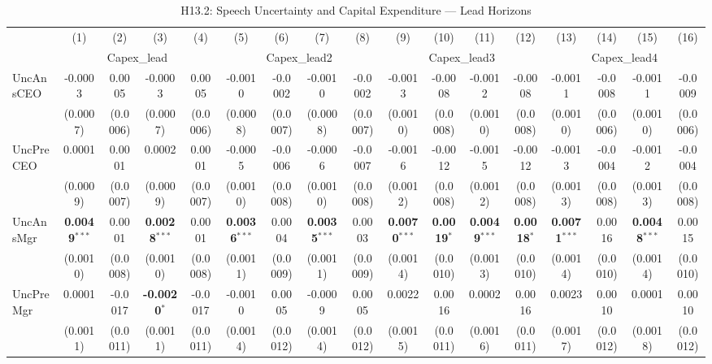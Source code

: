 \begin{landscape}
\begin{table}[H]
\setlength{\tabcolsep}{3pt}
\renewcommand{\arraystretch}{0.85}
\centering
\caption{H13.2: Speech Uncertainty and Capital Expenditure --- Lead Horizons}
\label{tab:h13_2}
\scriptsize
\begin{tabular}{lcccccccccccccccc}
\toprule
 & (1) & (2) & (3) & (4) & (5) & (6) & (7) & (8) & (9) & (10) & (11) & (12) & (13) & (14) & (15) & (16) \\
 & \multicolumn{4}{c}{Capex\_lead} & \multicolumn{4}{c}{Capex\_lead2} & \multicolumn{4}{c}{Capex\_lead3} & \multicolumn{4}{c}{Capex\_lead4} \\
\cmidrule(lr){2-5} \cmidrule(lr){6-9} \cmidrule(lr){10-13} \cmidrule(lr){14-17}
\midrule
UncAnsCEO & -0.0003 & 0.0005 & -0.0003 & 0.0005 & -0.0010 & -0.0002 & -0.0010 & -0.0002 & -0.0013 & -0.0008 & -0.0012 & -0.0008 & -0.0011 & -0.0008 & -0.0011 & -0.0009 \\
 & (0.0007) & (0.0006) & (0.0007) & (0.0006) & (0.0008) & (0.0007) & (0.0008) & (0.0007) & (0.0010) & (0.0008) & (0.0010) & (0.0008) & (0.0010) & (0.0006) & (0.0010) & (0.0006) \\
UncPreCEO & 0.0001 & 0.0001 & 0.0002 & 0.0001 & -0.0005 & -0.0006 & -0.0006 & -0.0007 & -0.0016 & -0.0012 & -0.0015 & -0.0012 & -0.0013 & -0.0004 & -0.0012 & -0.0004 \\
 & (0.0009) & (0.0007) & (0.0009) & (0.0007) & (0.0010) & (0.0008) & (0.0010) & (0.0008) & (0.0012) & (0.0008) & (0.0012) & (0.0008) & (0.0013) & (0.0008) & (0.0013) & (0.0008) \\
UncAnsMgr & \textbf{0.0049}$^{***}$ & 0.0001 & \textbf{0.0028}$^{***}$ & 0.0001 & \textbf{0.0036}$^{***}$ & 0.0004 & \textbf{0.0035}$^{***}$ & 0.0003 & \textbf{0.0070}$^{***}$ & \textbf{0.0019}$^{*}$ & \textbf{0.0049}$^{***}$ & \textbf{0.0018}$^{*}$ & \textbf{0.0071}$^{***}$ & 0.0016 & \textbf{0.0048}$^{***}$ & 0.0015 \\
 & (0.0010) & (0.0008) & (0.0010) & (0.0008) & (0.0011) & (0.0009) & (0.0011) & (0.0009) & (0.0014) & (0.0010) & (0.0013) & (0.0010) & (0.0014) & (0.0010) & (0.0014) & (0.0010) \\
UncPreMgr & 0.0001 & -0.0017 & \textbf{-0.0020}$^{*}$ & -0.0017 & -0.0010 & 0.0005 & -0.0009 & 0.0005 & 0.0022 & 0.0016 & 0.0002 & 0.0016 & 0.0023 & 0.0010 & 0.0001 & 0.0010 \\
 & (0.0011) & (0.0011) & (0.0011) & (0.0011) & (0.0014) & (0.0012) & (0.0014) & (0.0012) & (0.0015) & (0.0011) & (0.0016) & (0.0011) & (0.0017) & (0.0012) & (0.0018) & (0.0012) \\

\end{tabular}
\end{table}
\end{landscape}
